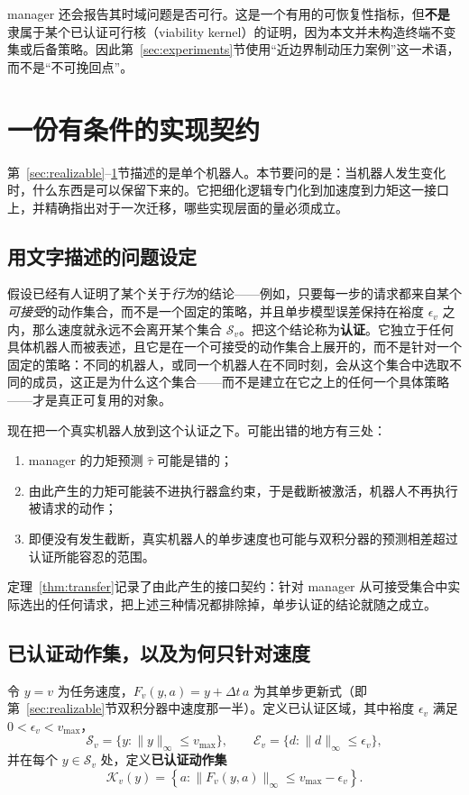 \documentclass[journal]{IEEEtran}
\begin{document}
manager 还会报告其时域问题是否可行。这是一个有用的可恢复性指标，但\textbf{不是}隶属于某个已认证可行核（viability kernel）的证明，因为本文并未构造终端不变集或后备策略。因此第~\ref{sec:experiments}节使用“近边界制动压力案例”这一术语，而不是“不可挽回点”。

\section{一份有条件的实现契约}
\label{sec:certificate}

第~\ref{sec:realizable}--\ref{sec:certificate}节描述的是单个机器人。本节要问的是：当机器人发生变化时，什么东西是可以保留下来的。它把细化逻辑专门化到加速度到力矩这一接口上，并精确指出对于一次迁移，哪些实现层面的量必须成立。

\subsection{用文字描述的问题设定}

假设已经有人证明了某个关于\emph{行为}的结论——例如，只要每一步的请求都来自某个\emph{可接受}的动作集合，而不是一个固定的策略，并且单步模型误差保持在裕度 $\epsilon_v$ 之内，那么速度就永远不会离开某个集合 $\mathcal S_v$。把这个结论称为\textbf{认证}。它独立于任何具体机器人而被表述，且它是在一个可接受的动作集合上展开的，而不是针对一个固定的策略：不同的机器人，或同一个机器人在不同时刻，会从这个集合中选取不同的成员，这正是为什么这个集合——而不是建立在它之上的任何一个具体策略——才是真正可复用的对象。

现在把一个真实机器人放到这个认证之下。可能出错的地方有三处：
\begin{enumerate}
\item manager 的力矩预测 $\hat\tau$ 可能是错的；
\item 由此产生的力矩可能装不进执行器盒约束，于是截断被激活，机器人不再执行被请求的动作；
\item 即便没有发生截断，真实机器人的单步速度也可能与双积分器的预测相差超过认证所能容忍的范围。
\end{enumerate}

定理~\ref{thm:transfer}记录了由此产生的接口契约：针对 manager 从可接受集合中实际选出的任何请求，把上述三种情况都排除掉，单步认证的结论就随之成立。

\subsection{已认证动作集，以及为何只针对速度}

令 $y=v$ 为任务速度，$F_v(y,a)=y+\Delta t\,a$ 为其单步更新式（即第~\ref{sec:realizable}节双积分器中速度那一半）。定义已认证区域，其中裕度 $\epsilon_v$ 满足 $0<\epsilon_v<v_{\max}$，
\[
\mathcal S_v=\{y:\|y\|_\infty\le v_{\max}\},
\qquad
\mathcal E_v=\{d:\|d\|_\infty\le\epsilon_v\},
\]
并在每个 $y\in\mathcal S_v$ 处，定义\textbf{已认证动作集}
\[
\mathcal K_v(y)=\left\{a:\|F_v(y,a)\|_\infty\le v_{\max}-\epsilon_v\right\}.
\]
\end{document}
